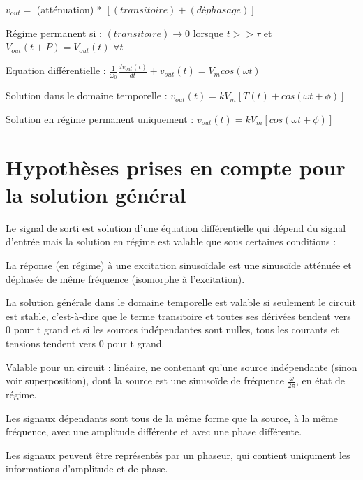 \documentclass[11pt]{report}
\begin{document}
\begin{framed}
   $v_{out} =$ (atténuation) * $\left[ (transitoire) + (déphasage) \right]$ \newline

   Régime permanent si : $(transitoire) \rightarrow 0$ lorsque $t >> \tau$ et $V_{out} (t +P) = V_{out} (t)$ $\forall t$ \newline

   Equation différentielle : $\frac{1}{\omega_0}\frac{dv_{out}(t)}{dt} + v_{out}(t) = V_{m}cos(\omega t)$\newline

   Solution dans le domaine temporelle : $v_{out}(t) = kV_m  \left[ T(t) + cos(\omega t +\phi) \right]$ \newline

   Solution en régime permanent uniquement : $v_{out}(t) = kV_m  \left[cos(\omega t +\phi) \right]$ \newline
\end{framed}

\section{Hypothèses prises en compte pour la solution général}
Le signal de sorti est solution d'une équation différentielle qui dépend du signal d'entrée mais la solution en régime est valable que sous certaines conditions :
\begin{framed}
   La réponse (en régime) à une excitation sinusoïdale est une sinusoïde atténuée et déphasée de même fréquence (isomorphe à l'excitation). \newline

   La solution générale dans le domaine temporelle est valable si seulement le circuit est stable, c'est-à-dire que le terme transitoire et toutes ses dérivées tendent vers 0 pour t grand et si les sources indépendantes sont nulles, tous les courants et tensions tendent vers 0 pour t grand.\newline

   Valable pour un circuit :  linéaire, ne contenant qu'une source indépendante (sinon voir superposition), dont la source est une sinusoïde de fréquence $\frac{\omega}{2\pi}$, en état de régime.\newline

   Les signaux dépendants sont tous de la même forme que la source, à la même fréquence, avec une amplitude différente et avec une phase différente. \newline

   Les signaux peuvent être représentés par un phaseur, qui contient uniqument les informations d'amplitude et de phase. \newline


\end{framed}
\newpage
\end{document}
